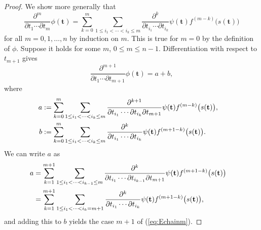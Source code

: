 \documentclass[10pt,a4paper]{amsart}
\def\bft{\mathbf{t}}
\begin{document}
\begin{proof}
We show more generally that
\begin{equation}\label{eq:Echainm}
\frac{\partial^m}{\partial t_1 \cdots \partial t_m} \phi(\bft)
= \sum_{k=0}^m
\sum_{1 \le i_1 < \cdots < i_k \le m}
\frac{\partial^k}{\partial t_{i_1} \cdots \partial t_{i_k}}
\psi(\bft) f^{(m-k)}\big(s(\bft)\big)
\end{equation}
for all $m=0,1,\ldots,n$ by induction on $m$.
This is true for $m=0$ by the definition of $\phi$.
Suppose it holds for some $m$, $0 \le m \le n-1$.
Differentiation with respect to $t_{m+1}$ gives
$$ 
\frac{\partial^{m+1}}{\partial t_1 \cdots \partial t_{m+1}} \phi(\bft)
   = a + b, $$
where
\begin{align*}
a &:= \sum_{k=0}^m 
\sum_{1 \le i_1 < \cdots < i_k \le m}
\frac{\partial^{k+1}}{\partial t_{i_1} \cdots \partial t_{i_k} \partial t_{m+1}}
\psi(\bft) f^{(m-k)}\big(s(\bft)\big), \cr
b &:= \sum_{k=0}^m 
\sum_{1 \le i_1 < \cdots < i_k \le m}
\frac{\partial^k}{\partial t_{i_1} \cdots \partial t_{i_k}}
\psi(\bft) f^{(m+1-k)}\big(s(\bft)\big).
\end{align*}
We can write $a$ as
\begin{align*}
a &= \sum_{k=1}^{m+1} 
\sum_{1 \le i_1 < \cdots < i_{k-1} \le m}
\frac{\partial^k}{\partial t_{i_1} \cdots \partial t_{i_{k-1}} \partial t_{m+1}}
\psi(\bft) f^{(m+1-k)}\big(s(\bft)\big) \cr
&= \sum_{k=1}^{m+1} 
\sum_{1 \le i_1 < \cdots < i_k = m+1}
\frac{\partial^k}{\partial t_{i_1} \cdots \partial t_{i_k}}
\psi(\bft) f^{(m+1-k)}\big(s(\bft)\big),
\end{align*}
and adding this to $b$ yields the case $m+1$ of (\ref{eq:Echainm}).
\end{proof}
\end{document}
